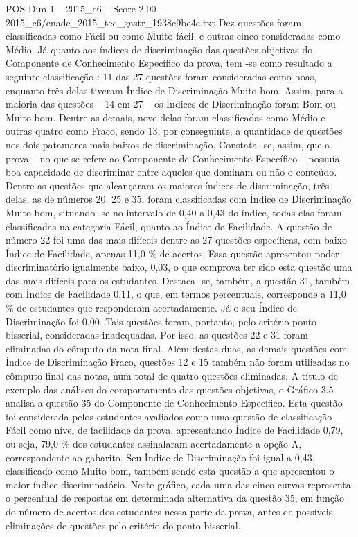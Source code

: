 \begin{textsample}{POS Dim 1 – 2015\_c6 – Score 2.00 – 2015\_c6/enade\_2015\_tec\_gastr\_1938c9be4e.txt}
Dez questões foram classificadas como Fácil ou como Muito fácil, e outras cinco consideradas como Médio.
Já quanto aos índices de discriminação das questões objetivas do Componente de Conhecimento Específico da prova, tem -se como resultado a seguinte classificação : 11 das 27 questões foram consideradas como boas, enquanto três delas tiveram Índice de Discriminação Muito bom.
Assim, para a maioria das questões – 14 em 27 – os Índices de Discriminação foram Bom ou Muito bom.
Dentre as demais, nove delas foram classificadas como Médio e outras quatro como Fraco, sendo 13, por conseguinte, a quantidade de questões nos dois patamares mais baixos de discriminação.
Constata -se, assim, que a prova – no que se refere ao Componente de Conhecimento Específico – possuía boa capacidade de discriminar entre aqueles que dominam ou não o conteúdo.
Dentre as questões que alcançaram os maiores índices de discriminação, três delas, as de números 20, 25 e 35, foram classificadas com Índice de Discriminação Muito bom, situando -se no intervalo de 0,40 a 0,43 do índice, todas elas foram classificadas na categoria Fácil, quanto ao Índice de Facilidade.
A questão de número 22 foi uma das mais difíceis dentre as 27 questões específicas, com baixo Índice de Facilidade, apenas 11,0 \% de acertos.
Essa questão apresentou poder discriminatório igualmente baixo, 0,03, o que comprova ter sido esta questão uma das mais difíceis para os estudantes.
Destaca -se, também, a questão 31, também com Índice de Facilidade 0,11, o que, em termos percentuais, corresponde a 11,0 \% de estudantes que responderam acertadamente.
Já o seu Índice de Discriminação foi 0,00.
Tais questões foram, portanto, pelo critério ponto bisserial, consideradas inadequadas.
Por isso, as questões 22 e 31 foram eliminadas do cômputo da nota final.
Além destas duas, as demais questões com Índice de Discriminação Fraco, questões 12 e 15 também não foram utilizadas no cômputo final das notas, num total de quatro questões eliminadas.
A título de exemplo das análises do comportamento das questões objetivas, o Gráfico 3.5 analisa a questão 35 do Componente de Conhecimento Específico.
Esta questão foi considerada pelos estudantes avaliados como uma questão de classificação Fácil como nível de facilidade da prova, apresentando Índice de Facilidade 0,79, ou seja, 79,0 \% dos estudantes assinalaram acertadamente a opção A, correspondente ao gabarito.
Seu Índice de Discriminação foi igual a 0,43, classificado como Muito bom, também sendo esta questão a que apresentou o maior índice discriminatório.
Neste gráfico, cada uma das cinco curvas representa o percentual de respostas em determinada alternativa da questão 35, em função do número de acertos dos estudantes nessa parte da prova, antes de possíveis eliminações de questões pelo critério do ponto bisserial.

\end{textsample}
